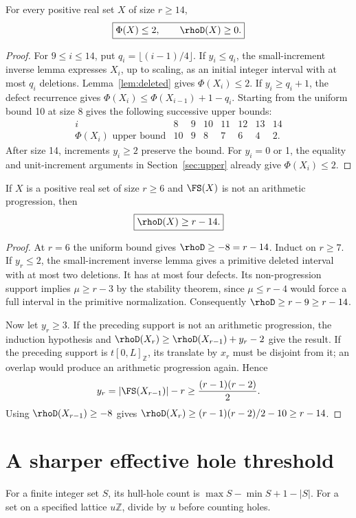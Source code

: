 \begin{theorem}[Threshold 14]\label{thm:phi14}
For every positive real set $X$ of size $r\geq14$,
\[
\boxed{\Phi(X)\leq2,\qquad\rhoD(X)\geq0.}
\]
\end{theorem}
\begin{proof}
For $9\leq i\leq14$, put $q_i=\lfloor(i-1)/4\rfloor$.
If $y_i\leq q_i$, the small-increment inverse lemma expresses $X_i$, up to
scaling, as an initial integer interval with at most $q_i$ deletions.
Lemma~\ref{lem:deleted} gives $\Phi(X_i)\leq2$.
If $y_i\geq q_i+1$, the defect recurrence gives
$\Phi(X_i)\leq\Phi(X_{i-1})+1-q_i$.
Starting from the uniform bound 10 at size 8 gives the following successive
upper bounds:
\[
\begin{array}{c|rrrrrrr}
i&8&9&10&11&12&13&14\\\hline
\Phi(X_i)\text{ upper bound}&10&9&8&7&6&4&2.
\end{array}
\]
After size 14, increments $y_i\geq2$ preserve the bound. For $y_i=0$ or 1,
the equality and unit-increment arguments in Section~\ref{sec:upper}
already give $\Phi(X_i)\leq2$.
\end{proof}

\begin{theorem}\label{thm:nonap}
If $X$ is a positive real set of size $r\geq6$ and $\FS(X)$ is not an
arithmetic progression, then
\[
\boxed{\rhoD(X)\geq r-14.}
\]
\end{theorem}
\begin{proof}
At $r=6$ the uniform bound gives $\rhoD\geq-8=r-14$.
Induct on $r\geq7$. If $y_r\leq2$, the small-increment inverse lemma gives
a primitive deleted interval with at most two deletions. It has at most
four defects. Its non-progression support implies $\mu\geq r-3$ by the
stability theorem, since $\mu\leq r-4$ would force a full interval in the
primitive normalization. Consequently $\rhoD\geq r-9\geq r-14$.

Now let $y_r\geq3$. If the preceding support is not an arithmetic
progression, the induction hypothesis and
$\rhoD(X_r)\geq\rhoD(X_{r-1})+y_r-2$ give the result.
If the preceding support is $t[0,L]_{\mathbb Z}$, its translate by $x_r$
must be disjoint from it; an overlap would produce an arithmetic progression
again. Hence
\[
y_r=|\FS(X_{r-1})|-r\geq\frac{(r-1)(r-2)}2.
\]
Using $\rhoD(X_{r-1})\geq-8$ gives
$\rhoD(X_r)\geq (r-1)(r-2)/2-10\geq r-14$.
\end{proof}

\section{A sharper effective hole threshold}\label{sec:holes}
For a finite integer set $S$, its hull-hole count is
$\max S-\min S+1-|S|$. For a set on a specified lattice $u\mathbb Z$,
divide by $u$ before counting holes.

